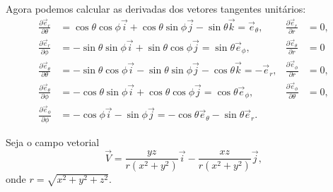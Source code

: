 \documentclass[a4paper,12pt, leqno, answers]{exam}
\newcommand{\devp}[2]{\frac{\partial #1}{\partial #2}}
\begin{document}
\begin{questions}
\begin{solution}
        Agora podemos calcular as derivadas dos vetores tangentes unit\'{a}rios:
        \begin{align*}
            \devp{\vec{e}_r}{\theta} &= \cos \theta \cos \phi \vec{i} + \cos \theta \sin \phi \vec{j} - \sin \theta \vec{k} = \vec{e}_\theta, &
            \devp{\vec{e}_r}{r} &= 0, \\
            \devp{\vec{e}_r}{\phi} &= -\sin \theta \sin \phi \vec{i} + \sin \theta \cos \phi \vec{j} = \sin \theta \vec{e}_\phi, &
            \devp{\vec{e}_\theta}{r} &= 0 \\
            \devp{\vec{e}_\theta}{\theta} &= - \sin \theta \cos \phi \vec{i} - \sin \theta \sin \phi \vec{j} - \cos \theta \vec{k} = -\vec{e}_r, &
            \devp{\vec{e}_\phi}{r} &= 0, \\
            \devp{\vec{e}_\theta}{\phi} &= - \cos \theta \sin \phi \vec{i} + \cos \theta \cos \phi \vec{j} = \cos \theta \vec{e}_\phi, &
            \devp{\vec{e}_\phi}{\theta} &= 0, \\
            \devp{\vec{e}_\phi}{\phi} &= -\cos \phi \vec{i} - \sin \phi \vec{j} = - \cos \theta \vec{e}_\theta - \sin \theta \vec{e}_r.
        \end{align*}
    \end{solution}
  
    \question Seja o campo vetorial
    \[
    \vec{V} = \frac{y z}{r(x^2 + y^2)} \vec{i} - \frac{x z}{r (x^2 + y^2)} \vec{j},
    \]
    onde $r = \sqrt{x^2 + y^2 + z^2}$.
    \begin{parts}

\end{parts}
\end{questions}
\end{document}
